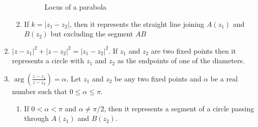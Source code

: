 \begin{enumerate}
\begin{enumerate}
\begin{figure}[H]
\begin{center}
        \caption{\label{fig:flbep} Locus of a parabola}
      \end{center}
    \end{figure}
    \item If $k = |z_1 - z_2|$, then it represents the straight line joining $A(z_1)$ and $B(z_2)$ but excluding the segment $AB$
      \begin{figure}[H]
        \begin{center}
        \end{center}
      \end{figure}
  \end{enumerate}
  \item $|z - z_1|^2 + |z - z_2|^2 = |z_1 - z_2|^2$. If $z_1$ and $z_2$ are two fixed points then it represents a circle with $z_1$
    and $z_2$ as the endpoints of one of the diameters.
    \begin{figure}[H]
      \begin{center}
      \end{center}
    \end{figure}
  \item $\arg\left(\frac{z - z_1}{z - z_2}\right) = \alpha$. Let $z_1$ and $z_2$ be any two fixed points and $\alpha$ be a real
    number such that $0\leq \alpha \leq \pi$.
    \begin{enumerate}
    \item If $0 < \alpha < \pi$ and $\alpha \neq \pi/2$, then it represents a segment of a circle passing through $A(z_1)$ and
      $B(z_2)$.
      \begin{figure}[H]
        \begin{center}
          \begin{tikzpicture}

\end{tikzpicture}
\end{center}
\end{figure}
\end{enumerate}
\end{enumerate}
